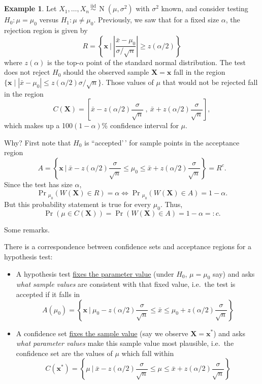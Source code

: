 \documentclass[
]{book}
\newcommand{\bx}{{\boldsymbol x}}
\newcommand{\bX}{{\boldsymbol X}}
\DeclareMathOperator{\N}{N}
\newcommand{\iid}{\,\overset{\text{iid}}{\sim}\,}
\theoremstyle{definition}
\theoremstyle{definition}
\newtheorem{example}{Example}[chapter]
\theoremstyle{definition}
\theoremstyle{definition}
\theoremstyle{remark}
\begin{document}
\begin{example}
\protect\hypertarget{exm:invertnormtest}{}\label{exm:invertnormtest}Let \(X_1,\dots,X_n\iid\N(\mu,\sigma^2)\) with \(\sigma^2\) known, and consider testing \(H_0:\mu=\mu_0\) versus \(H_1:\mu\neq\mu_0\).
Previously, we saw that for a fixed size \(\alpha\), the rejection region is given by
\[
R = \left\{ \bx \ \bigg| \ \left| \frac{\bar x-\mu_0}{\sigma/\sqrt n} \right| \geq z(\alpha/2)  \right\}
\]
where \(z(\alpha)\) is the top-\(\alpha\) point of the standard normal distribution.
The test does not reject \(H_0\) should the observed sample \(\bX=\bx\) fall in the region \(\{\bx \mid |\bar x - \mu_0| \leq z(\alpha/2)\sigma/\sqrt n \}\).
Those values of \(\mu\) that would not be rejected fall in the region
\[
C(\bX) = \left[ \bar x- z(\alpha/2)\frac{\sigma}{\sqrt n} \ , \   \bar x + z(\alpha/2)\frac{\sigma}{\sqrt n} \right],
\]
which makes up a 100\((1-\alpha)\)\% confidence interval for \(\mu\).

Why? First note that \(H_0\) is ``accepted'\,' for sample points in the acceptance region
\[
A = \left\{ \bx \ \bigg| \ \bar x- z(\alpha/2)\frac{\sigma}{\sqrt n} \leq \mu_0 \leq  \bar x + z(\alpha/2)\frac{\sigma}{\sqrt n} \right\} = R^c.
\]
Since the test has size \(\alpha\),
\[
\Pr\!{}_{\mu_0}(W(\bX) \in R) = \alpha \Leftrightarrow \Pr\!{}_{\mu_0}(W(\bX) \in A) = 1 - \alpha.
\]
But this probability statement is true for every \(\mu_0\).
Thus,
\[
\Pr(\mu \in C(\bX)) = \Pr(W(\bX) \in A) = 1 - \alpha =: c.
\]
\end{example}

Some remarks.

There is a correspondence between confidence sets and acceptance regions for a hypothesis test:

\begin{itemize}
\item
  A hypothesis test \uline{fixes the parameter value} (under \(H_0\), \(\mu=\mu_0\) say) and asks \emph{what sample values} are consistent with that fixed value, i.e.~the test is accepted if it falls in
  \[
  A(\mu_0) = \left\{ \bx \ \bigg| \ \mu_0- z(\alpha/2)\frac{\sigma}{\sqrt n} \leq \bar x \leq  \mu_0 + z(\alpha/2)\frac{\sigma}{\sqrt n} \right\}
  \]
\item
  A confidence set \uline{fixes the sample value} (say we observe \(\bX =\bx^*\)) and asks \emph{what parameter values} make this sample value most plausible, i.e.~the confidence set are the values of \(\mu\) which fall within
  \[
  C(\bx^*) =  \left\{ \mu \ \bigg| \ \bar x- z(\alpha/2)\frac{\sigma}{\sqrt n} \leq \mu \leq  \bar x + z(\alpha/2)\frac{\sigma}{\sqrt n} \right\}
  \]
\end{itemize}
\end{document}
